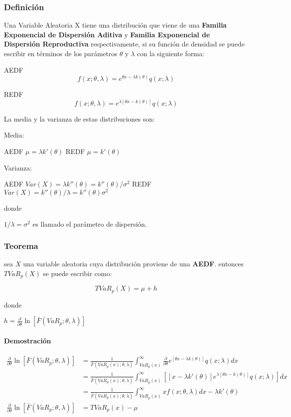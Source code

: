 \documentclass[]{article}
\begin{document}
\hypertarget{definicion}{%
\subsubsection{Definición}\label{definicion}}

Una Variable Aleatoria X tiene una distribución que viene de una
\textbf{Familia Exponencial de Dispersión Aditiva} y \textbf{Familia
Exponencial de Dispersión Reproductiva} respectivamente, si su función
de densidad se puede escribir en términos de los parámetros \(\theta\) y
\(\lambda\) con la siguiente forma:

AEDF \[f(x;\theta, \lambda)=e^{\theta x-\lambda k(\theta)}q(x;\lambda)\]

REDF
\[f(x;\theta, \lambda)=e^{\lambda[\theta x- k(\theta)]}q(x;\lambda)\]

La media y la varianza de estas distribuciones son:

Media:

AEDF \(\mu = \lambda k'(\theta)\) REDF \(\mu=k'(\theta)\)

Varianza:

AEDF \(Var(X) = \lambda k''(\theta)=k''(\theta)/\sigma^2\) REDF
\(Var(X) = k''(\theta)/\lambda=k''(\theta)\sigma^2\)

donde

\(1/\lambda = \sigma^2\) es llamado el parámetro de dispersión.

\hypertarget{teorema-1}{%
\subsubsection{Teorema}\label{teorema-1}}

sea \(X\) una variable aleatoria cuya distribución proviene de una
\textbf{AEDF}. entonces \(TVaR_p(X)\) se puede escribir como:

\[TVaR_p(X)=\mu + h\]

donde

\(h=\frac{\partial}{\partial \theta}\ln[\bar{F}(VaR_p;\theta,\lambda)]\)

\hypertarget{demostracion-1}{%
\paragraph{Demostración}\label{demostracion-1}}

\[\begin{array}{rl}
\frac{\partial}{\partial \theta}\ln[\bar{F}(VaR_p;\theta,\lambda)] &\displaystyle= \frac{1}{\bar{F}(VaR_p(x);\theta,\lambda)} \int_{VaR_p(x)}^{\infty} \frac{\partial}{\partial \theta}e^{[\theta x - \lambda k(\theta)]}q(x;\lambda)dx\\
&\displaystyle= \frac{1}{\bar{F}(VaR_p(x);\theta,\lambda)} \int_{VaR_p(x)}^{\infty} \left[[x- \lambda k'(\theta)]e^{\lambda[\theta x - k(\theta)]}q(x;\lambda)\right]dx\\
&\displaystyle= \frac{1}{\bar{F}(VaR_p(x);\theta,\lambda)} \int_{VaR_p(x)}^{\infty} xf(x;\theta,\lambda)dx - \lambda k'(\theta)\\
\frac{\partial}{\partial \theta}\ln[\bar{F}(VaR_p;\theta,\lambda)] &\displaystyle= TVaR_p(x) - \mu
\end{array}\]
\end{document}
